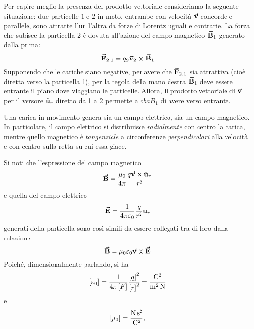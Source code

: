 \begin{example}
	Per capire meglio la presenza del prodotto vettoriale consideriamo la seguente situazione: due particelle $1$ e $2$ in moto, entrambe con velocità $\vb*{\va{v}}$ concorde e parallele, sono attratte l'un l'altra da forze di Lorentz  uguali e contrarie. La forza che subisce la particella 2 è dovuta all'azione del campo magnetico $\vb*{\va{B}}_1$ generato dalla prima:
	\begin{equation*}
		\vb*{\va{F}}_{2,1}=q_2\vb*{\va{v}}_2\cross\vb*{\va{B}}_1
	\end{equation*}
	Supponendo che le cariche siano negative, per avere che $\vb*{\va{F}}_{2,1}$ sia attrattiva (cioè diretta verso la particella 1), per la regola della mano destra $\vb*{\va{B}}_1$ deve essere entrante il piano dove viaggiano le particelle. Allora, il prodotto vettoriale di $\vb*{\va{v}}$ per il versore $\hat{\mathbf{u}}_r$ diretto da 1 a 2 permette a $vba{B}_1$ di avere verso entrante.
\end{example}
\begin{observe}
	Una carica in movimento genera sia un campo elettrico, sia un campo magnetico. In particolare, il campo elettrico si distribuisce \textit{radialmente} con centro la carica, mentre quello magnetico è \textit{tangenziale} a circonferenze \textit{perpendicolari} alla velocità e con centro sulla retta su cui essa giace.
\end{observe}
Si noti che l'espressione del campo magnetico
\begin{equation*}
	\vb*{\va{B}}=\frac{\mu_0}{4\pi}\frac{q\vb*{\va{v}}\cross\hat{\mathbf{u}}_r}{r^2}
\end{equation*}
e quella del campo elettrico
\begin{equation*}
	\vb*{\va{E}}=\frac{1}{4\pi\varepsilon_0}\frac{q}{r^2}\hat{\mathbf{u}}_r
\end{equation*}
generati della particella sono così simili da essere collegati tra di loro dalla relazione
\begin{equation}
	\vb*{\va{B}}=\mu_0\varepsilon_0\vb*{\va{v}}\cross\vb*{\va{E}}
\end{equation}
Poiché, dimensionalmente parlando, si ha
\begin{equation*}
	\left[\epsilon_0\right]=\frac{1}{4\pi\left[F\right]}\frac{\left[q\right]^2}{\left[r\right]^2}=\unit[per-mode = fraction]{\coulomb\squared\per\meter\squared\per\newton}
\end{equation*}
e
\begin{equation*}
	\left[\mu_0\right]=\unit[per-mode = fraction]{\newton\second\squared\per\coulomb\squared},
\end{equation*}
